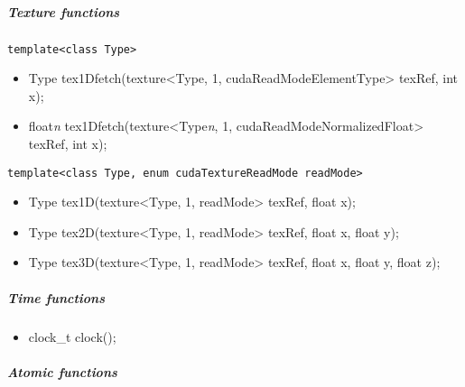 					\subparagraph{Texture functions}
					
\begin{verbatim}template<class Type>\end{verbatim}
\begin{itemize}
	\item Type tex1Dfetch(texture<Type, 1, cudaReadModeElementType> texRef, int x);
	\item float\emph{n} tex1Dfetch(texture<Type\emph{n}, 1, cudaReadModeNormalizedFloat> texRef, int x);
\end{itemize}

\begin{verbatim}template<class Type, enum cudaTextureReadMode readMode>\end{verbatim}
\begin{itemize}
	\item Type tex1D(texture<Type, 1, readMode> texRef, float x);
	\item Type tex2D(texture<Type, 1, readMode> texRef, float x, float y);
	\item Type tex3D(texture<Type, 1, readMode> texRef, float x, float y, float z);
\end{itemize}

					\subparagraph{Time functions}

\begin{itemize}
	\item clock\_t clock();
\end{itemize}

					\subparagraph{Atomic functions}

